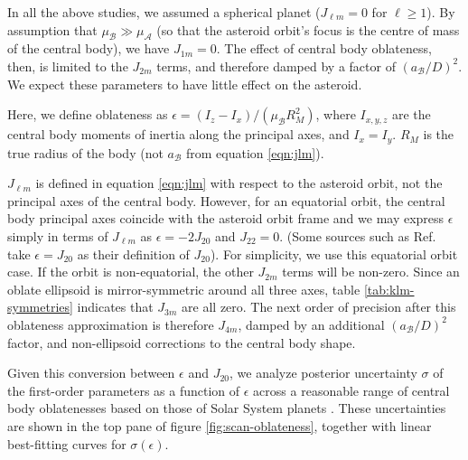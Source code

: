\documentclass[fleqn,usenatbib]{mnras}
\begin{document}
In all the above studies, we assumed a spherical planet ($J_{\ell m} = 0$ for $\ell \geq 1$). By assumption that $\mu_\mathcal{B} \gg \mu_\mathcal{A}$ (so that the asteroid orbit's focus is the centre of mass of the central body), we have $J_{1m} = 0$. The effect of central body oblateness, then, is limited to the $J_{2m}$ terms, and therefore damped by a factor of $(a_\mathcal{B} / D)^2$. We expect these parameters to have little effect on the asteroid.

Here, we define oblateness as $\epsilon = (I_z - I_x)/(\mu_\mathcal{B} R_M^2)$, where $I_{x,y,z}$ are the central body moments of inertia along the principal axes, and $I_x = I_y$. $R_M$ is the true radius of the body (not $a_\mathcal{B}$ from equation \ref{eqn:jlm}). 

$J_{\ell m}$ is defined in equation \ref{eqn:jlm} with respect to the asteroid orbit, not the principal axes of the central body. However, for an equatorial orbit, the central body principal axes coincide with the asteroid orbit frame and we may express $\epsilon$ simply in terms of $J_{\ell m}$ as $\epsilon = -2J_{20}$ and $J_{22} = 0$. (Some sources such as Ref.~\cite{paterLissauer2015} take $\epsilon=J_{20}$ as their definition of $J_{20}$). For simplicity, we use this equatorial orbit case. If the orbit is non-equatorial, the other $J_{2m}$ terms will be non-zero. Since an oblate ellipsoid is mirror-symmetric around all three axes, table \ref{tab:klm-symmetries} indicates that $J_{3m}$ are all zero. The next order of precision after this oblateness approximation is therefore $J_{4m}$, damped by an additional $(a_\mathcal{B}/D)^2$ factor, and  non-ellipsoid corrections to the central body shape.

Given this conversion between $\epsilon$ and $J_{20}$, we analyze posterior uncertainty $\sigma$ of the first-order parameters as a function of $\epsilon$ across a reasonable range of central body oblatenesses based on those of Solar System planets \cite{paterLissauer2015}. These uncertainties are shown in the top pane of figure \ref{fig:scan-oblateness}, together with linear best-fitting curves for $\sigma(\epsilon)$.
\end{document}
